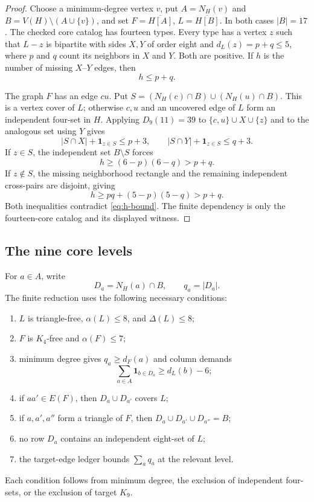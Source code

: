 \documentclass[11pt,reqno,a4paper]{amsart}
\theoremstyle{definition}
\theoremstyle{remark}
\newcommand{\comp}[1]{\overline{#1}}
\begin{document}
\begin{proof}
Choose a minimum-degree vertex $v$, put $A=N_H(v)$ and
$B=V(H)\setminus(A\cup\{v\})$, and set
$F=\comp{H[A]}$, $L=\comp{H[B]}$. In both cases $|B|=17$.
The checked core catalog has fourteen types. Every type has a vertex
$z$ such that $L-z$ is bipartite with sides $X,Y$ of order eight and
$d_L(z)=p+q\le5$, where $p$ and $q$ count its neighbors in $X$ and
$Y$. Both are positive. If $h$ is the number of missing $X$--$Y$
edges, then
\begin{equation}\label{eq:h-bound}
 h\le p+q.
\end{equation}

The graph $F$ has an edge $cu$. Put
$S=(N_H(c)\cap B)\cup(N_H(u)\cap B)$. This is a vertex cover of $L$;
otherwise $c,u$ and an uncovered edge of $L$ form an independent
four-set in $H$. Applying $D_9(11)=39$ to
$\{c,u\}\cup X\cup\{z\}$ and to the analogous set using $Y$ gives
\[
 |S\cap X|+\mathbf1_{z\in S}\le p+3,\qquad
 |S\cap Y|+\mathbf1_{z\in S}\le q+3.
\]
If $z\in S$, the independent set $B\setminus S$ forces
\[
 h\ge(6-p)(6-q)>p+q.
\]
If $z\notin S$, the missing neighborhood rectangle and the remaining
independent cross-pairs are disjoint, giving
\[
 h\ge pq+(5-p)(5-q)>p+q.
\]
Both inequalities contradict \eqref{eq:h-bound}. The finite dependency
is only the fourteen-core catalog and its displayed witness.
\end{proof}

\subsection{The nine core levels}

For $a\in A$, write
\[
 D_a=N_H(a)\cap B,\qquad q_a=|D_a|.
\]
The finite reduction uses the following necessary conditions:
\begin{enumerate}[label=\textup{(C\arabic*)},leftmargin=3.2em]
\item $L$ is triangle-free, $\alpha(L)\le8$, and $\Delta(L)\le8$;
\item $F$ is $K_4$-free and $\alpha(F)\le7$;
\item minimum degree gives $q_a\ge d_F(a)$ and column demands
\[
 \sum_{a\in A}\mathbf1_{b\in D_a}\ge d_L(b)-6;
\]
\item if $aa'\in E(F)$, then $D_a\cup D_{a'}$ covers $L$;
\item if $a,a',a''$ form a triangle of $F$, then
$D_a\cup D_{a'}\cup D_{a''}=B$;
\item no row $D_a$ contains an independent eight-set of $L$;
\item the target-edge ledger bounds $\sum_aq_a$ at the relevant level.
\end{enumerate}
Each condition follows from minimum degree, the exclusion of independent
four-sets, or the exclusion of target $K_9$.
\end{document}
